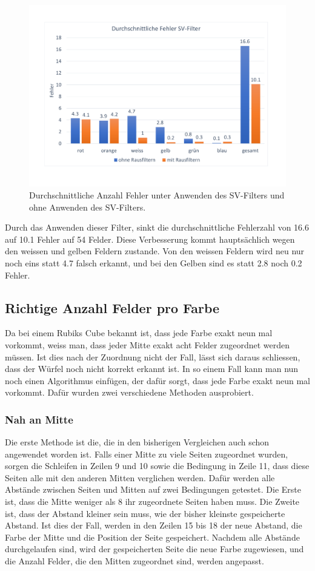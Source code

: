 \documentclass[a4paper, 12pt]{article}
\begin{document}
\begin{figure}[H]
\includegraphics[scale=0.4]{Fehler_SV_Filter} 
\caption{Durchschnittliche Anzahl Fehler unter Anwenden des SV-Filters und ohne Anwenden des SV-Filters.}
\end{figure}
Durch das Anwenden dieser Filter, sinkt die durchschnittliche Fehlerzahl von 16.6 auf 10.1 Fehler auf 54 Felder. Diese Verbesserung kommt hauptsächlich wegen den weissen und gelben Feldern zustande. Von den weissen Feldern wird neu nur noch eins statt 4.7 falsch erkannt, und bei den Gelben sind es statt 2.8 noch 0.2 Fehler.
\subsection{Richtige Anzahl Felder pro Farbe}
Da bei einem Rubiks Cube bekannt ist, dass jede Farbe exakt neun mal vorkommt, weiss man, dass jeder Mitte exakt acht Felder zugeordnet werden müssen. Ist dies nach der Zuordnung nicht der Fall, lässt sich daraus schliessen, dass der Würfel noch nicht korrekt erkannt ist. In so einem Fall kann man nun noch einen Algorithmus einfügen, der dafür sorgt, dass jede Farbe exakt neun mal vorkommt. Dafür wurden zwei verschiedene Methoden ausprobiert.
\subsubsection{Nah an Mitte}
Die erste Methode ist die, die in den bisherigen Vergleichen auch schon angewendet worden ist. Falls einer Mitte zu viele Seiten zugeordnet wurden, sorgen die Schleifen in Zeilen 9 und 10 sowie die Bedingung in Zeile 11, dass diese Seiten alle mit den anderen Mitten verglichen werden. Dafür werden alle Abstände zwischen Seiten und Mitten auf zwei Bedingungen getestet. Die Erste ist, dass die Mitte weniger als 8 ihr zugeordnete Seiten haben muss. Die Zweite ist, dass der Abstand kleiner sein muss, wie der bisher kleinste gespeicherte Abstand. Ist dies der Fall, werden in den Zeilen 15 bis 18 der neue Abstand, die Farbe der Mitte und die Position der Seite gespeichert. Nachdem alle Abstände durchgelaufen sind, wird der gespeicherten Seite die neue Farbe zugewiesen, und die Anzahl Felder, die den Mitten zugeordnet sind, werden angepasst.

\end{document}
